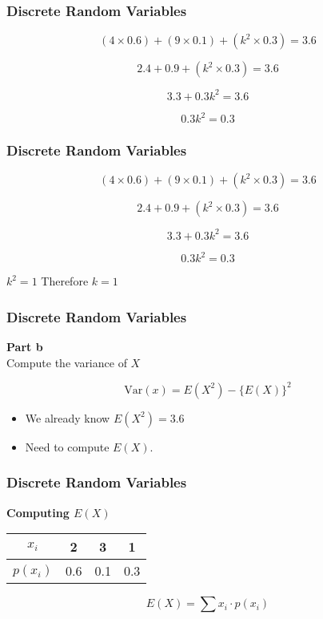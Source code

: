 \documentclass{beamer}
\begin{document}
\begin{frame}
\frametitle{Discrete Random Variables}
\Large
\vspace{-1.8cm}
\[(4 \times 0.6) + (9\times 0.1) + (k^2\times 0.3) = 3.6 \]

\[2.4 + 0.9 + (k^2\times 0.3) = 3.6 \]

\[ 3.3 + 0.3k^2 = 3.6\]

\[0.3k^2 =0.3\]

\end{frame}
\begin{frame}
\frametitle{Discrete Random Variables}
\Large
\vspace{-1.5cm}
\[(4 \times 0.6) + (9\times 0.1) + (k^2\times 0.3) = 3.6 \]

\[2.4 + 0.9 + (k^2\times 0.3) = 3.6 \]

\[ 3.3 + 0.3k^2 = 3.6\]

\[0.3k^2 =0.3\]
\begin{center}
$k^2 = 1$  \qquad Therefore $k=1$
\end{center}
\end{frame}
\begin{frame}
\frametitle{Discrete Random Variables}
\Large
\vspace{-2cm}
\textbf{Part b}\\
Compute the variance of $X$

\[ \mbox{Var}(x) = E(X^2) - \{E(X)\}^2 \]


\begin{itemize}
\item We already know $E(X^2) =3.6$
\item Need to compute $E(X)$.
\end{itemize}
\end{frame}
\begin{frame}
\frametitle{Discrete Random Variables}
\Large
\vspace{-2cm}
\textbf{Computing $E(X)$}
\begin{center}
\begin{tabular}{|c|c|c|c|}
\hline
$x_i$ & 2 & 3 & 1 \\ \hline 
$p(x_i)$ & 0.6 &  0.1 & 0.3 \\ \hline
\end{tabular}
\end{center}

\[ E(X) =  \sum  x_i \cdot p(x_i)   \]

\end{frame}
\end{document}
